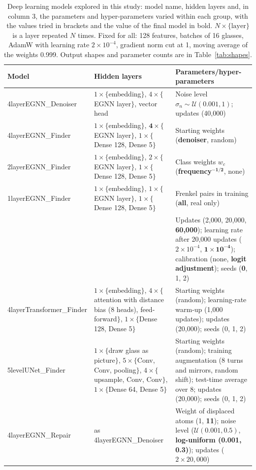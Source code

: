 \begin{table}[t]
\centering
\caption{Deep learning models explored in this study: model name, hidden layers and, in column 3, the parameters and hyper-parameters varied within each group, with the values tried in brackets and the value of the final model in bold. $N\times\{\text{layer}\}$ is a layer repeated $N$ times. Fixed for all: 128 features, batches of 16 glasses, AdamW with learning rate $2\times10^{-4}$, gradient norm cut at 1, moving average of the weights 0.999. Output shapes and parameter counts are in Table~\ref{tab:shapes}.}
\label{tab:models}
\footnotesize\setlength{\tabcolsep}{4pt}
\begin{tabularx}{\linewidth}{@{}l>{\raggedright\arraybackslash}X>{\raggedright\arraybackslash}p{2.05in}@{}}
\toprule
Model & Hidden layers & Parameters/hyper-parameters \\
\midrule
4layerEGNN\_Denoiser & $1\times\{$embedding$\}$, $4\times\{$EGNN layer$\}$, vector head & Noise level $\sigma_n\sim\mathcal U(0.001,1)$; updates (40,000) \\
\addlinespace
4layerEGNN\_Finder & $1\times\{$embedding$\}$, $\mathbf{4}\times\{$EGNN layer$\}$, $1\times\{$Dense 128, Dense 5$\}$ & Starting weights (\textbf{denoiser}, random) \\
2layerEGNN\_Finder & $1\times\{$embedding$\}$, $2\times\{$EGNN layer$\}$, $1\times\{$Dense 128, Dense 5$\}$ & Class weights $w_c$ (\textbf{frequency}$^{\mathbf{-1/2}}$, none) \\
1layerEGNN\_Finder & $1\times\{$embedding$\}$, $1\times\{$EGNN layer$\}$, $1\times\{$Dense 128, Dense 5$\}$ & Frenkel pairs in training (\textbf{all}, real only) \\
 & & Updates (2,000, 20,000, \textbf{60,000}); learning rate after 20,000 updates ($2\times10^{-4}$, $\mathbf{1\times10^{-4}}$); calibration (none, \textbf{logit adjustment}); seeds (\textbf{0}, 1, 2) \\
\addlinespace
4layerTransformer\_Finder & $1\times\{$embedding$\}$, $4\times\{$attention with distance bias (8 heads), feed-forward$\}$, $1\times\{$Dense 128, Dense 5$\}$ & Starting weights (random); learning-rate warm-up (1,000 updates); updates (20,000); seeds (0, 1, 2) \\
5levelUNet\_Finder & $1\times\{$draw glass as picture$\}$, $5\times\{$Conv, Conv, pooling$\}$, $4\times\{$upsample, Conv, Conv$\}$, $1\times\{$Dense 64, Dense 5$\}$ & Starting weights (random); training augmentation (8 turns and mirrors, random shift); test-time average over 8; updates (20,000); seeds (0, 1, 2) \\
\addlinespace
4layerEGNN\_Repair & as 4layerEGNN\_Denoiser & Weight of displaced atoms (1, \textbf{11}); noise level ($\mathcal U(0.001,0.5)$, \textbf{log-uniform (0.001, 0.3)}); updates ($2\times20{,}000$) \\
\bottomrule
\end{tabularx}
\end{table}
